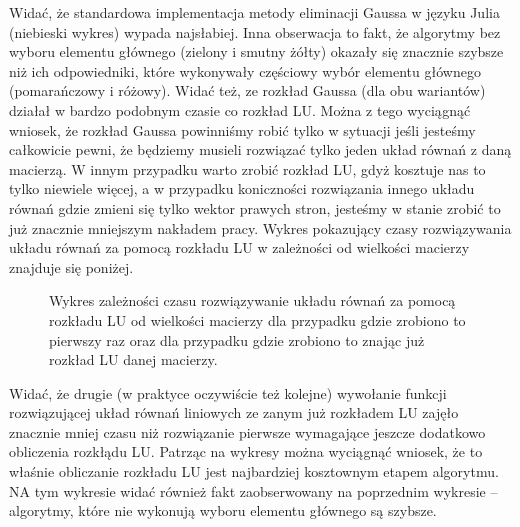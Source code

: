 \documentclass[]{article}
\begin{document}
Widać, że standardowa implementacja metody eliminacji Gaussa w języku Julia (niebieski wykres) wypada najsłabiej. Inna obserwacja to fakt, że algorytmy bez wyboru elementu głównego (zielony i smutny żółty) okazały się znacznie szybsze niż ich odpowiedniki, które wykonywały częściowy wybór elementu głównego (pomarańczowy i różowy). Widać też, ze rozkład Gaussa (dla obu wariantów) działał w bardzo podobnym czasie co rozkład LU. Można z tego wyciągnąć wniosek, że rozkład Gaussa powinniśmy robić tylko w sytuacji jeśli jesteśmy całkowicie pewni, że będziemy musieli rozwiązać tylko jeden układ równań z daną macierzą. W innym przypadku warto zrobić rozkład LU, gdyż kosztuje nas to tylko niewiele więcej, a w przypadku koniczności rozwiązania innego układu równań gdzie zmieni się tylko wektor prawych stron, jesteśmy w stanie zrobić to już znacznie mniejszym nakładem pracy. Wykres pokazujący czasy rozwiązywania układu równań za pomocą rozkładu LU w zależności od wielkości macierzy znajduje się poniżej.
\clearpage

\begin{figure}[h]
	\centering
	 \hfill
	\caption*{Wykres zależności czasu rozwiązywanie układu równań za pomocą rozkładu LU od wielkości macierzy dla przypadku gdzie zrobiono to pierwszy raz oraz dla przypadku gdzie zrobiono to znając już rozkład LU danej macierzy.}
\end{figure}

Widać, że drugie (w praktyce oczywiście też kolejne) wywołanie funkcji rozwiązującej układ równań liniowych ze zanym już rozkładem LU zajęło znacznie mniej czasu niż rozwiązanie pierwsze wymagające jeszcze dodatkowo obliczenia rozkłądu LU. Patrząc na wykresy można wyciągnąć wniosek, że to właśnie obliczanie rozkładu LU jest najbardziej kosztownym etapem algorytmu. NA tym wykresie widać również fakt zaobserwowany na poprzednim wykresie -- algorytmy, które nie wykonują wyboru elementu głównego są szybsze.
\end{document}
